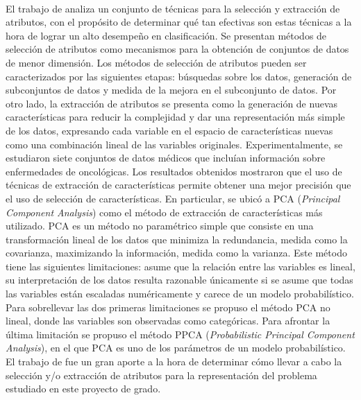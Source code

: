 \paragraph{}El trabajo de \citet{survey-feature-selection-extraction} analiza un conjunto de técnicas para la selección y extracción de atributos, con el propósito de determinar qué tan efectivas son estas técnicas a la hora de lograr un alto desempeño en clasificación.
Se presentan métodos de selección de atributos como mecanismos para la obtención de conjuntos de datos de menor dimensión.
Los métodos de selección de atributos pueden ser caracterizados por las siguientes etapas: búsquedas sobre los datos, generación de subconjuntos de datos y medida de la mejora en el subconjunto de datos.
Por otro lado, la extracción de atributos se presenta como la generación de nuevas características para reducir la complejidad y dar una representación más simple de los datos, expresando cada variable en el espacio de características nuevas como una combinación lineal de las variables originales.
Experimentalmente, se estudiaron siete conjuntos de datos médicos que incluían información sobre enfermedades de oncológicas.
Los resultados obtenidos mostraron que el uso de técnicas de extracción de características permite obtener una mejor precisión que el uso de selección de características.
En particular, se ubicó a PCA (\textit{Principal Component Analysis}) como el método de extracción de características más utilizado.
PCA es un método no paramétrico simple que consiste en una transformación lineal de los datos que minimiza la redundancia, medida como la covarianza, maximizando la información, medida como la varianza.
Este método tiene las siguientes limitaciones: asume que la relación entre las variables es lineal, su interpretación de los datos resulta razonable únicamente si se asume que todas las variables están escaladas numéricamente y carece de un modelo probabilístico.
Para sobrellevar las dos primeras limitaciones se propuso el método PCA no lineal, donde las variables son observadas como categóricas.
Para afrontar la última limitación se propuso el método PPCA (\textit{Probabilistic Principal Component Analysis}), en el que PCA es uno de los parámetros de un modelo probabilístico. 
El trabajo de \citet{survey-feature-selection-extraction} fue un gran aporte a la hora de determinar cómo llevar a cabo la selección y/o extracción de atributos para la representación del problema estudiado en este proyecto de grado.



